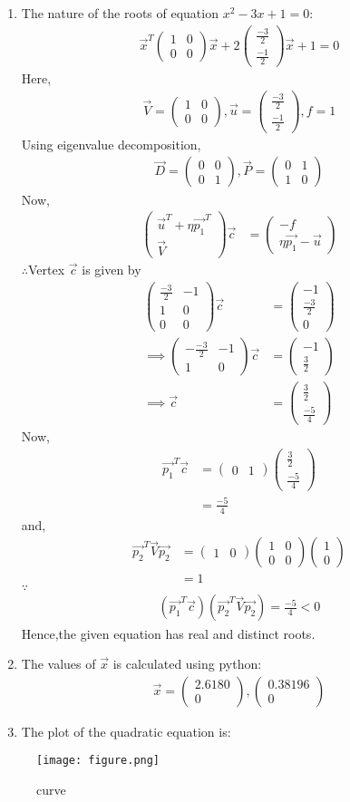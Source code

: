 \documentclass[journal,12pt,twocolumn]{IEEEtran}
\newcommand{\myvec}[1]{\ensuremath{\begin{pmatrix}#1\end{pmatrix}}}
\begin{document}
\begin{enumerate}
\item The nature of the roots of equation $x^2-3x+1=0$:
\begin{align}
   \vec{x}^T\myvec{1&0\\0&0}\vec{x}+2\myvec{\frac{-3}{2}\\\frac{-1}{2}}\vec{x}+1=0 
   \end{align}
   Here,
\begin{align}
\vec{V} = \myvec{1 & 0 \\ 0 & 0},\vec{u}=\myvec{\frac{-3}{2} \\ \frac{-1}{2}},f=1
\end{align}
Using eigenvalue decomposition,
\begin{align}
\vec{D} = \myvec{0 & 0\\0 & 1} ,\vec{P}=\myvec{0 & 1\\1 & 0}
\end{align}
Now,
\begin{align}
\myvec{\vec{u}^T + \eta\vec{p_1}^T \\ \vec{V}}\vec{c} &= \myvec{-f \\ \eta\vec{p_1}-\vec{u}} 
\end{align}
$\therefore$Vertex $\vec{c}$ is given by
\begin{align}
\myvec{\frac{-3}{2} & -1 \\ 1 & 0 \\ 0 & 0}\vec{c} &= \myvec{-1\\ \frac{-3}{2} \\ 0} \\
\implies  \myvec{-\frac{-3}{2} & -1 \\ 1 & 0}\vec{c} &= \myvec{-1\\ \frac{3}{2}}
\\
\implies \vec{c} &= \myvec{\frac{3}{2}\\\frac{-5}{4}}
\end{align}
Now,
\begin{align}
\vec{p_1}^T\vec{c} &= \myvec{0 & 1}\myvec{\frac{3}{2}\\\frac{-5}{4}}
\\
&= \frac{-5}{4}
\end{align}
and,
\begin{align}
\vec{p_2}^T\vec{V}\vec{p_2} &= \myvec{1 & 0}\myvec{1 & 0\\0& 0}\myvec{1 \\ 0}
\\
&= 1
\end{align}
$\because$
\begin{align}
(\vec{p_1}^T\vec{c})(\vec{p_2}^T\vec{V}\vec{p_2}) = \frac{-5}{4}<0
\end{align}
Hence,the given equation has real and distinct roots.\\
\item The values of $\vec{x}$ is calculated using python:
\begin{align}
    \vec{x}=\myvec{2.6180\\0}, \myvec{0.38196\\0}
\end{align}
\item The plot of the quadratic equation is:
\end{enumerate}
\begin{figure}[!ht]
\texttt{[image: figure.png]}
\caption{curve}
\label{fig:curve}	
\end{figure}
\end{document}
